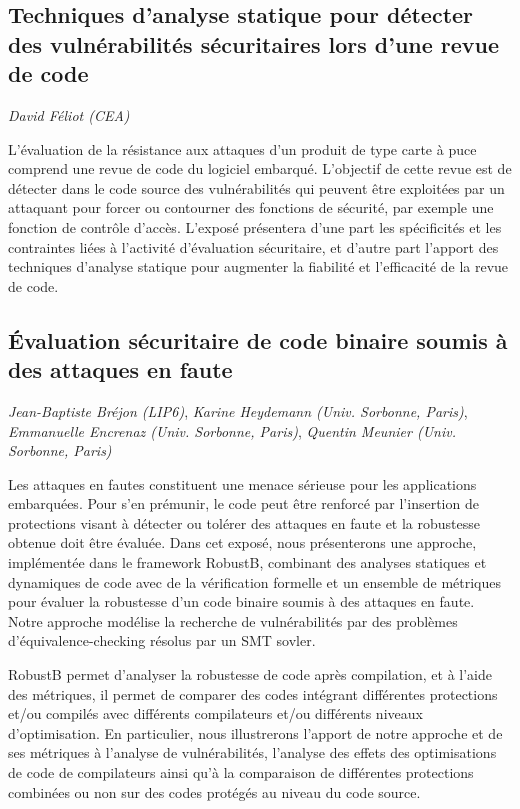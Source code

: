 \documentclass[a4paper,11pt]{article}
\begin{document}
\subsection{Techniques d'analyse statique pour détecter des vulnérabilités sécuritaires lors d'une revue de code}
\label{sec:org67325c8}
\emph{David Féliot (CEA)}

L'évaluation de la résistance aux attaques d'un produit de type carte à puce comprend une revue de code du logiciel embarqué. L'objectif de cette revue est de détecter dans le code source des vulnérabilités qui peuvent être exploitées par un attaquant pour forcer ou contourner des fonctions de sécurité, par exemple une fonction de contrôle d'accès. L'exposé présentera d'une part les spécificités et les contraintes liées à l'activité d'évaluation sécuritaire, et d'autre part l'apport des techniques d'analyse statique pour augmenter la fiabilité et l'efficacité de la revue de code.

\subsection{Évaluation sécuritaire de code binaire soumis à des attaques en faute}
\label{sec:org90483d8}
\emph{Jean-Baptiste Bréjon (LIP6)},
\emph{Karine Heydemann (Univ. Sorbonne, Paris)},
\emph{Emmanuelle Encrenaz (Univ. Sorbonne, Paris)},
\emph{Quentin Meunier (Univ. Sorbonne, Paris)}

Les attaques en fautes constituent une menace sérieuse pour les
applications embarquées. Pour s’en prémunir, le code peut être
renforcé par l’insertion de protections visant à détecter ou tolérer
des attaques en faute et la robustesse obtenue doit être évaluée. Dans
cet exposé, nous présenterons une approche, implémentée dans le
framework RobustB, combinant des analyses statiques et dynamiques de
code avec de la vérification formelle et un ensemble de métriques pour
évaluer la robustesse d'un code binaire soumis à des attaques en
faute. Notre approche modélise la recherche de vulnérabilités par des
problèmes d'équivalence-checking résolus par un SMT sovler.

RobustB permet d’analyser la robustesse de code après compilation, et
à l’aide des métriques, il permet de comparer des codes intégrant
différentes protections et/ou compilés avec différents compilateurs
et/ou différents niveaux d’optimisation. En particulier, nous
illustrerons l’apport de notre approche et de ses métriques à
l'analyse de vulnérabilités, l'analyse des effets des optimisations de
code de compilateurs ainsi qu'à la comparaison de différentes
protections combinées ou non sur des codes protégés au niveau du code
source.
\end{document}
